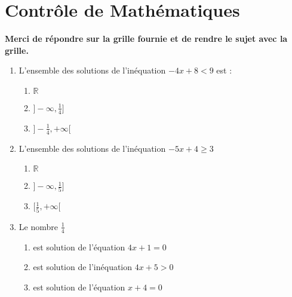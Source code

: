 \documentclass[oneside,twoside]{book}
\begin{document}
\chapter*{Contrôle de Mathématiques}

\let\MauvaiseReponse\null
\let\BonneReponse\null


{\bf Merci de répondre sur la grille fournie et de rendre le sujet avec la grille.}
\vspace{2em}


\begin{enumerate}


\item L'ensemble des solutions de l'inéquation $-4 x+8<9$ est :

\begin{enumerate}

\item\MauvaiseReponse $\mathbb{R}$


\item\MauvaiseReponse $]-\infty, \frac{1}{4}]$
\item\BonneReponse $]-\frac{1}{4},+\infty[$

\end{enumerate}






\item L'ensemble des solutions de l'inéquation $-5x+4 \geqslant 3$

\begin{enumerate}

\item\MauvaiseReponse $\mathbb{R}$

\item\BonneReponse $]-\infty,\frac{1}{5}]$
\item\MauvaiseReponse $[\frac{1}{5},+\infty[$


\end{enumerate}





\item Le nombre $\frac{1}{4}$

\begin{enumerate}

\item\MauvaiseReponse est solution de l'équation $4x+1=0$
\item\BonneReponse est solution de l'inéquation $4x+5>0$

\item\MauvaiseReponse est solution de l'équation $x+4=0$



\end{enumerate}
\end{enumerate}
\end{document}
